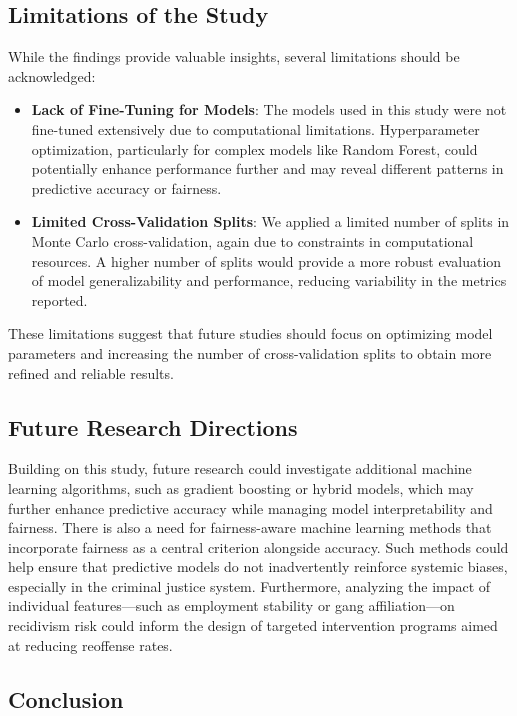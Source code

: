 \documentclass[12pt]{article}
\begin{document}
\subsection{Limitations of the Study}

While the findings provide valuable insights, several limitations should be acknowledged:
\begin{itemize}
    \item \textbf{Lack of Fine-Tuning for Models}: The models used in this study were not fine-tuned extensively due to computational limitations. Hyperparameter optimization, particularly for complex models like Random Forest, could potentially enhance performance further and may reveal different patterns in predictive accuracy or fairness.
    \item \textbf{Limited Cross-Validation Splits}: We applied a limited number of splits in Monte Carlo cross-validation, again due to constraints in computational resources. A higher number of splits would provide a more robust evaluation of model generalizability and performance, reducing variability in the metrics reported.
\end{itemize}

These limitations suggest that future studies should focus on optimizing model parameters and increasing the number of cross-validation splits to obtain more refined and reliable results.

\subsection{Future Research Directions}

Building on this study, future research could investigate additional machine learning algorithms, such as gradient boosting or hybrid models, which may further enhance predictive accuracy while managing model interpretability and fairness. There is also a need for fairness-aware machine learning methods that incorporate fairness as a central criterion alongside accuracy. Such methods could help ensure that predictive models do not inadvertently reinforce systemic biases, especially in the criminal justice system. Furthermore, analyzing the impact of individual features—such as employment stability or gang affiliation—on recidivism risk could inform the design of targeted intervention programs aimed at reducing reoffense rates.

\subsection{Conclusion}
\end{document}

